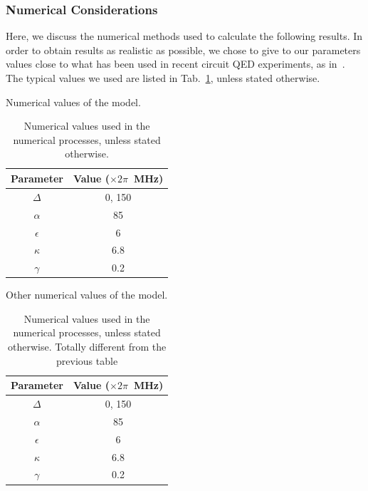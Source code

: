 \subsubsection{Numerical Considerations}

Here, we discuss the numerical methods used to calculate the following results. In order to obtain results as realistic as possible, we chose to give to our parameters values close to what has been used in recent circuit QED experiments, as in~\cite{Fin09}. The typical values we used are listed in Tab.~\ref{tab-values}, unless stated otherwise.

\begin{table} \begin{center}
\caption{Numerical values of the model. }
\begin{tabular}{c|c}
Parameter & Value ($\times 2 \pi$~MHz) \\ \hline \hline
$\Delta$ & 0, 150 \\
${\alpha}$ & 85 \\
${\epsilon}$ & 6 \\
${\kappa}$ & 6.8 \\
${\gamma}$ & 0.2
\end{tabular}
\label{tab-values}
\caption*{Numerical values used in the numerical processes, unless stated otherwise. }
\end{center}\end{table}


\begin{table} \begin{center}
\caption{Other numerical values of the model. }
\begin{tabular}{c|c}
Parameter & Value ($\times 2 \pi$~MHz) \\ \hline \hline
$\Delta$ & 0, 150 \\
${\alpha}$ & 85 \\
${\epsilon}$ & 6 \\
${\kappa}$ & 6.8 \\
${\gamma}$ & 0.2
\end{tabular}
\label{tab-values2}
\caption*{Numerical values used in the numerical processes, unless stated otherwise. Totally different from the previous table}
\end{center}\end{table}

